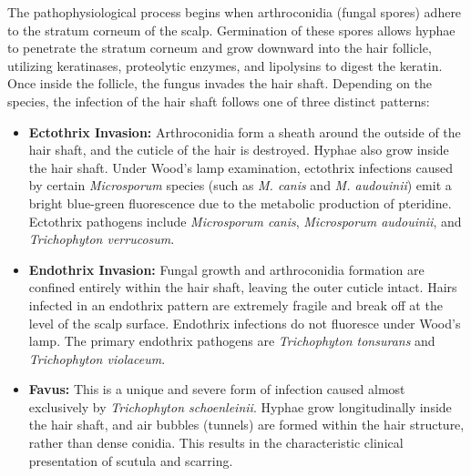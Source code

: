 The pathophysiological process begins when arthroconidia (fungal spores) adhere to the stratum corneum of the scalp. Germination of these spores allows hyphae to penetrate the stratum corneum and grow downward into the hair follicle, utilizing keratinases, proteolytic enzymes, and lipolysins to digest the keratin. Once inside the follicle, the fungus invades the hair shaft. Depending on the species, the infection of the hair shaft follows one of three distinct patterns:
\begin{itemize}
    \item \textbf{Ectothrix Invasion:} Arthroconidia form a sheath around the outside of the hair shaft, and the cuticle of the hair is destroyed. Hyphae also grow inside the hair shaft. Under Wood's lamp examination, ectothrix infections caused by certain \textit{Microsporum} species (such as \textit{M. canis} and \textit{M. audouinii}) emit a bright blue-green fluorescence due to the metabolic production of pteridine. Ectothrix pathogens include \textit{Microsporum canis}, \textit{Microsporum audouinii}, and \textit{Trichophyton verrucosum}.
    \item \textbf{Endothrix Invasion:} Fungal growth and arthroconidia formation are confined entirely within the hair shaft, leaving the outer cuticle intact. Hairs infected in an endothrix pattern are extremely fragile and break off at the level of the scalp surface. Endothrix infections do not fluoresce under Wood's lamp. The primary endothrix pathogens are \textit{Trichophyton tonsurans} and \textit{Trichophyton violaceum}.
    \item \textbf{Favus:} This is a unique and severe form of infection caused almost exclusively by \textit{Trichophyton schoenleinii}. Hyphae grow longitudinally inside the hair shaft, and air bubbles (tunnels) are formed within the hair structure, rather than dense conidia. This results in the characteristic clinical presentation of scutula and scarring.
\end{itemize}

